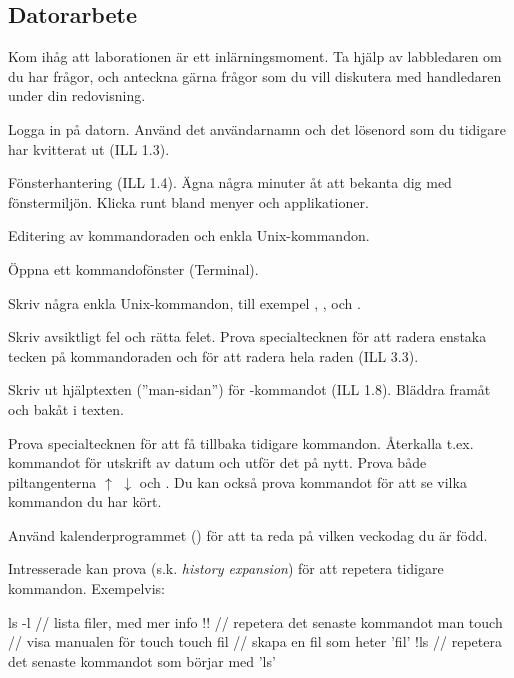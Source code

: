 \subsection*{Datorarbete}
Kom ihåg att laborationen är ett inlärningsmoment. Ta hjälp av labbledaren om du har frågor, och anteckna gärna frågor som du vill diskutera med handledaren under din redovisning.
\begin{Datorarbete}
	\item Logga in på datorn. Använd det användarnamn och det lösenord som du tidigare har kvitterat ut (ILL 1.3).
	\item Fönsterhantering (ILL 1.4). Ägna några minuter åt att bekanta dig med fönstermiljön. Klicka runt bland menyer och applikationer.
	\item Editering av kommandoraden och enkla Unix-kommandon.

	\begin{Deluppgifter}
		\item Öppna ett kommandofönster (Terminal).
		\item Skriv några enkla Unix-kommandon, till exempel , ,  och .
		\item Skriv avsiktligt fel och rätta felet. Prova specialtecknen för att radera enstaka tecken på kommandoraden och för att radera hela raden (ILL 3.3).
		\item Skriv ut hjälptexten (''man-sidan'') för -kommandot (ILL 1.8). Bläddra framåt och bakåt i texten.
		\item Prova specialtecknen för att få tillbaka tidigare kommandon. Återkalla t.ex. kommandot för utskrift av datum och utför det på nytt. Prova både piltangenterna $\uparrow$ $\downarrow$ och . Du kan också prova kommandot  för att se vilka kommandon du har kört.
		\item Använd kalenderprogrammet () för att ta reda på vilken veckodag du är född.
		\item Intresserade kan prova \code{!} (s.k. \emph{history expansion}) för att repetera tidigare kommandon. Exempelvis:
		\begin{Code}
			ls -l      // lista filer, med mer info
			!!         // repetera det senaste kommandot
			man touch  // visa manualen för touch
			touch fil  // skapa en fil som heter 'fil'
			!ls        // repetera det senaste kommandot som börjar med 'ls'
		\end{Code}
	\end{Deluppgifter}


\end{Datorarbete}
